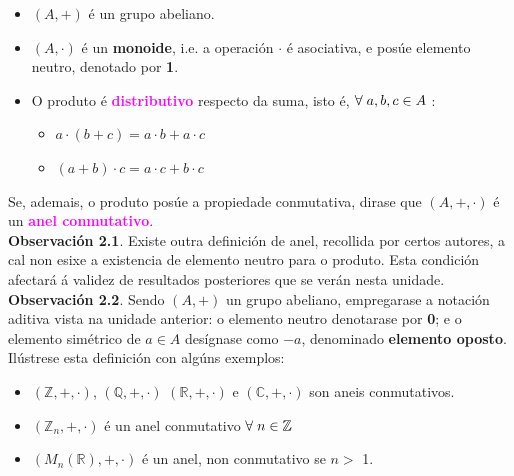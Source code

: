 \documentclass[twoside]{report}
\newcommand{\magbf}[1]{\textcolor{magenta}{\textbf{#1}}} %
\theoremstyle{mystyle}
\begin{document}
\begin{itemize}

    \item $(A, +)$ é un grupo abeliano. 
    
    \vspace{1mm}
    
    \item $(A, \cdot)$ é un \textbf{monoide}, i.e. a operación $\cdot$ é asociativa, e posúe elemento neutro, denotado por \textbf{1}.
    
    \vspace{1mm}
    
    \item O produto é \magbf{distributivo} respecto da suma, isto é, $\forall \hspace{1mm} a,b,c \in A$ :
    
    \begin{itemize}
    
        \item $a \cdot (b + c) = a \cdot b + a \cdot c$
        
        \item $(a + b) \cdot c = a \cdot c + b \cdot c$
        
    \end{itemize}
    
\end{itemize}

\noindent Se, ademais, o produto posúe a propiedade conmutativa, dirase que $(A,+,\cdot)$ é un \magbf{anel conmutativo}.\\

\noindent \textbf{Observación 2.1}. Existe outra definición de anel, recollida por certos autores, a cal non esixe a existencia de elemento neutro para o produto. Esta condición afectará á validez de resultados posteriores que se verán nesta unidade.\\

\noindent \textbf{Observación 2.2}. Sendo $(A,+)$ un grupo abeliano, empregarase a notación aditiva vista na unidade anterior: o elemento neutro denotarase por \textbf{0}; e o elemento simétrico de $a \in A$ desígnase como $-a$, denominado \textbf{elemento oposto}.\\

\noindent Ilústrese esta definición con algúns exemplos:

\begin{itemize}
    \item $(\mathbb{Z},+,\cdot)$, $(\mathbb{Q},+,\cdot)$ $(\mathbb{R},+,\cdot)$ e $(\mathbb{C},+,\cdot)$ son aneis conmutativos.
    
    \item $(\mathbb{Z}_{n},+,\cdot)$ é un anel conmutativo $\forall \hspace{1mm} n \in \mathbb{Z}$
    
    \item $(M_{n}(\mathbb{R}),+,\cdot)$ é un anel, non conmutativo se $n >$  1.
\end{itemize}
\end{document}
